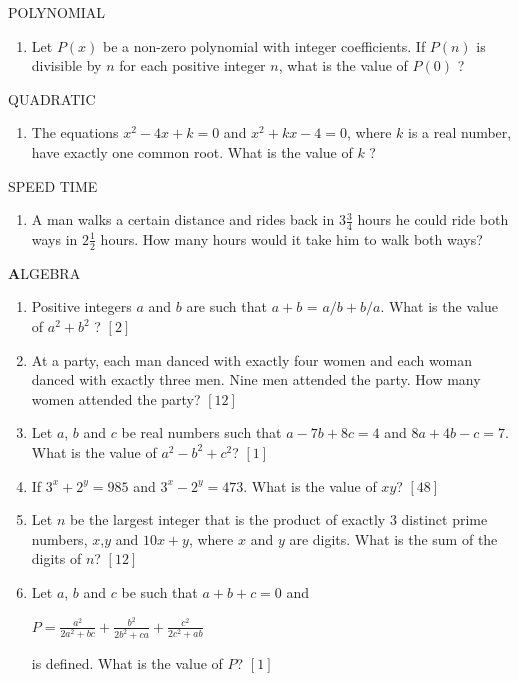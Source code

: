 \documentclass{article}
\begin{document}
\begin{center}
POLYNOMIAL
\end{center}
\begin{enumerate}
\item Let $P\left(x\right)$ be a non-zero polynomial with integer coefficients. If $P\left(n\right)$ is divisible by $n$ for each positive integer $n$, what is the value of $P\left(0\right)$ ?
\end{enumerate}

\begin{center}
QUADRATIC
\end{center}
\begin{enumerate}
\item The equations $x^2-4x+k=0$ and $x^2+kx-4=0$, where $k$ is a real number, have exactly one common root. What is the value of $k$ ?
\end{enumerate}


\begin{center}
SPEED TIME
\end{center}
\begin{enumerate}
\item A man walks a certain distance and rides back in $3\frac{3}{4}$ hours he could ride both ways in $2\frac{1}{2}$ hours. How many hours would it take him to walk both ways?
\end{enumerate}
\begin{center}
	\textbf ALGEBRA 
\end{center}
\begin{enumerate}
	\item Positive integers $a$ and $b$ are such that $a+b$ = $a/b+b/a$. What is the value of $a^2+b^2$ ? $[2]$
	\item At a party, each man danced with exactly four women and each woman danced with exactly
three men. Nine men attended the party. How many women attended the party? $[12]$
\item Let $a$, $b$ and $c$ be real numbers such that $a-7b+8c=4$ and $8a+4b-c=7$. What is the value of $a^2-b^2+c^2$? $[1]$
\item If $3^x+2^y=985$ and $3^x-2^y=473$. What is the value of $xy$? $[48]$
\item Let $n$ be the largest integer that is the product of exactly $3$ distinct prime numbers, $x$,$y$ and
$10x + y$, where $x$ and $y$ are digits. What is the sum of the digits of $n$? $[12]$
\item Let $a$, $b$ and $c$ be such that $a + b + c = 0$ and
	\begin{center}
		$P= \frac{a^2}{2a^2+bc} + \frac{b^2}{2b^2+ca} + \frac{c^2}{2c^2+ab}$
	\end{center}
		is defined. What is the value of $P$? $[1]$
\end{enumerate}
\end{document}

